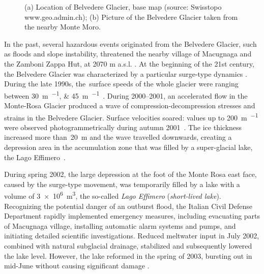 \begin{figure}
    \centering
    \caption{(a) Location of Belvedere Glacier, base map (source: Swisstopo
        www.geo.admin.ch); (b) Picture of the Belvedere Glacier taken from the nearby Monte Moro.}
    \label{fig:1:studyarea}
\end{figure}

In the past, several hazardous events originated from the Belvedere Glacier, such as floods
and slope instability, threatened the nearby village of Macugnaga and the Zamboni Zappa
Hut, at 2070 m a.s.l. \citep{Kaab2004}.
At the beginning of the 21st century, the Belvedere Glacier was characterized by a
particular surge-type dynamics  \citep{Haeberli2002}.
During the late 1990s, the~surface speeds of the whole glacier were ranging between
\SIlist{30;45}{\meter\per\year}~\citep{Roethlisberger1985, Kaab2005}.
During 2000--2001, an accelerated flow in the Monte-Rosa Glacier produced a wave of
compression-decompression stresses and strains in the Belvedere Glacier.
Surface velocities soared: values up to \SI{200}{\meter\per\year} were observed
photogrammetrically during autumn 2001~\citep{Kaab2004}.
The ice thickness increased more than~\SI{20}{\meter} and the wave travelled downwards,
creating a depression area in the accumulation zone that was filled by a super-glacial
lake, the Lago Effimero~\citep{Haeberli2002, Mortara2009}.

During spring 2002, the large depression at the foot of the Monte Rosa east face, caused by the surge-type movement, was temporarily filled by a lake with a volume of \SI{3e6}{\cubic\meter}, the so-called \textit{Lago Effimero} (\textit{short-lived lake}).
Recognizing the potential danger of an outburst flood, the Italian Civil Defense Department rapidly 
implemented emergency measures, including evacuating parts of Macugnaga village, installing automatic 
alarm systems and pumps, and initiating detailed scientific investigations. 
Reduced meltwater input in July 2002, combined with natural subglacial drainage, stabilized and subsequently 
lowered the lake level.
However, the lake reformed in the spring of 2003, bursting out in mid-June without causing significant damage \citep{Kaab2004}.

